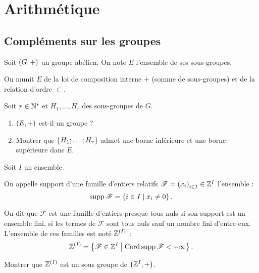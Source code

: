 \chapter{Arithmétique}

\minitoc

\section{Compléments sur les groupes}


\begin{exo}[Exercice 3]
Soit \(\groupe{G}\) un groupe abélien. On note \(E\) l'ensemble de ses sous-groupes.

On munit \(E\) de la loi de composition interne \(+\) (somme de sous-groupes) et de la relation d'ordre \(\subset\).

Soit \(r\in\mathbb{N}^*\) et \(H_1,\dots,H_r\) des sous-groupes de \(G\).

\begin{enumerate}
\item \(\groupe{E}\) est-il un groupe ? \\

\item Montrer que \(\left\lbrace H_1;\dots;H_r\right\rbrace\) admet une borne inférieure et une borne supérieure dans \(E\).
\end{enumerate}
\end{exo}

\begin{corr}
\end{corr}

\begin{exo}
\renewcommand{\F}{\mathscr{F}}

Soit \(I\) un ensemble.

On appelle support d'une famille d'entiers relatifs \(\F=\paren{x_i}_{i\in I}\in\Z^I\) l'ensemble : \[\supp\F=\accol{i\in I\tq x_i\not=0}.\]

On dit que \(\F\) est une famille d'entiers presque tous nuls si son support est un ensemble fini, \cad si les termes de \(\F\) sont tous nuls sauf un nombre fini d'entre eux. L'ensemble de ces familles est noté \(\mathbb{Z}^{\left(I\right)}\) : \[\Z^{\paren{I}}=\accol{\F\in\Z^I\tq\Card\supp\F<\pinf}.\]

Montrer que \(\mathbb{Z}^{\left(I\right)}\) est un sous groupe de \(\groupe{\Z^I}\).
\end{exo}

